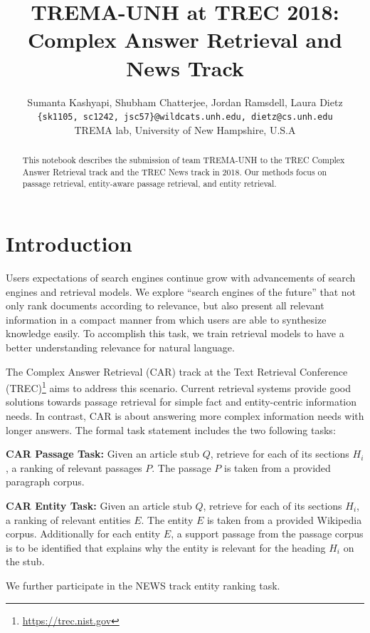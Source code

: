 \documentclass{article}
\title{TREMA-UNH at TREC 2018: Complex Answer Retrieval and News Track}
\author{Sumanta Kashyapi, Shubham Chatterjee, Jordan Ramsdell, Laura Dietz \\
\texttt{\{sk1105, sc1242, jsc57\}@wildcats.unh.edu, dietz@cs.unh.edu}\\
TREMA lab, University of New Hampshire, U.S.A}
\date{}
\begin{document}
\maketitle 

\begin{abstract}
This notebook describes the submission of team TREMA-UNH to the TREC Complex Answer Retrieval track and the TREC News track in 2018. Our methods focus on passage retrieval, entity-aware passage retrieval, and entity retrieval.
\end{abstract}

\section{Introduction}
\label{S:1}

Users expectations of search engines continue grow with advancements of search engines and retrieval models. We explore ``search engines of the future'' that not only rank documents according to relevance, but also present all relevant information in a compact manner from which users are able to synthesize knowledge easily.  To accomplish this task, we train retrieval models to have a better understanding relevance for natural language. 

The Complex Answer Retrieval (CAR)\cite{trecdata21} track at the Text Retrieval Conference (TREC)\footnote{\url{https://trec.nist.gov}} aims to address this scenario. Current retrieval systems provide good solutions towards passage retrieval for simple fact and entity-centric information needs.
In contrast, CAR is about answering more complex information needs with longer answers.
The formal task statement includes the two following tasks:

\noindent \textbf{CAR Passage Task:} Given an article stub $Q$, retrieve for each of its sections $H_i$, a ranking of relevant passages $P$. The passage $P$ is taken from a provided paragraph corpus. %

\noindent \textbf{CAR Entity Task:} Given an article stub $Q$, retrieve for each of its sections $H_i$, a ranking of relevant entities $E$. The entity $E$ is taken from a provided Wikipedia corpus. Additionally for each entity $E$, a support passage from the passage corpus is to be identified that explains why the entity is relevant for the heading $H_i$ on the stub.
\medskip

\noindent We further participate in the NEWS track entity ranking task. 
\end{document}
